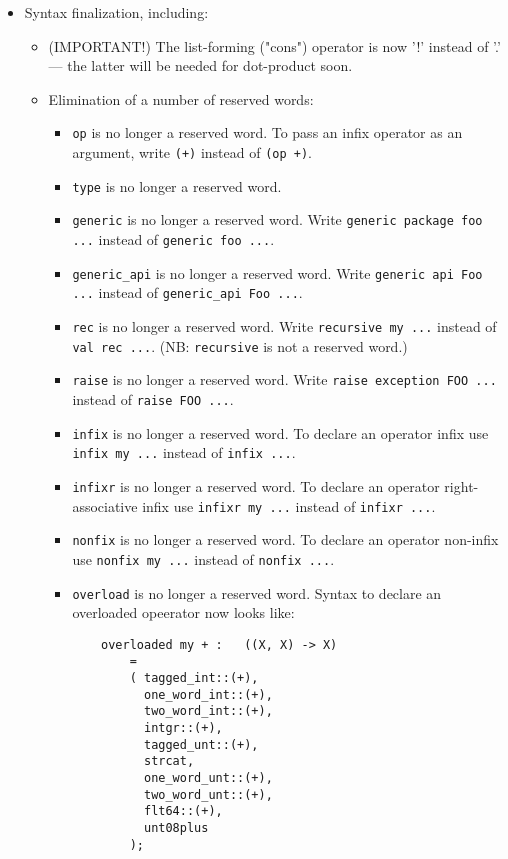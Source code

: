 \begin{itemize}
\item Syntax finalization, including:
\begin{itemize}
\item (IMPORTANT!)  The list-forming ("cons") operator is now '!' instead of '.' --- the latter will be needed for dot-product soon.
\item Elimination of a number of reserved words:
\begin{itemize}
\item {\tt op} is no longer a reserved word.  To pass an infix operator as an argument, write {\tt (+)} instead of {\tt (op +)}.
\item {\tt type} is no longer a reserved word.
\item {\tt generic} is no longer a reserved word.  Write {\tt generic package foo ...} instead of {\tt generic foo ...}.
\item {\tt generic\_api} is no longer a reserved word.  Write {\tt generic api Foo ...} instead of {\tt generic\_api Foo ...}.
\item {\tt rec} is no longer a reserved word.  Write {\tt recursive my ...} instead of {\tt val rec ...}. (NB: {\tt recursive} is not a reserved word.)
\item {\tt raise} is no longer a reserved word.  Write {\tt raise exception FOO ...} instead of {\tt raise FOO ...}.
\item {\tt infix} is no longer a reserved word.  To declare an operator infix use {\tt infix my ...} instead of {\tt infix ...}.
\item {\tt infixr} is no longer a reserved word.  To declare an operator right-associative infix use {\tt infixr my ...} instead of {\tt infixr ...}.
\item {\tt nonfix} is no longer a reserved word.  To declare an operator non-infix use {\tt nonfix my ...} instead of {\tt nonfix ...}.
\item {\tt overload} is no longer a reserved word. Syntax to declare an overloaded opeerator now looks like:
\begin{verbatim}
    overloaded my + :   ((X, X) -> X)
        =
        ( tagged_int::(+),
          one_word_int::(+),
          two_word_int::(+),
          intgr::(+),
          tagged_unt::(+),
          strcat,
          one_word_unt::(+),
          two_word_unt::(+),
          flt64::(+),
          unt08plus
        );


\end{verbatim}
\end{itemize}
\end{itemize}
\end{itemize}
